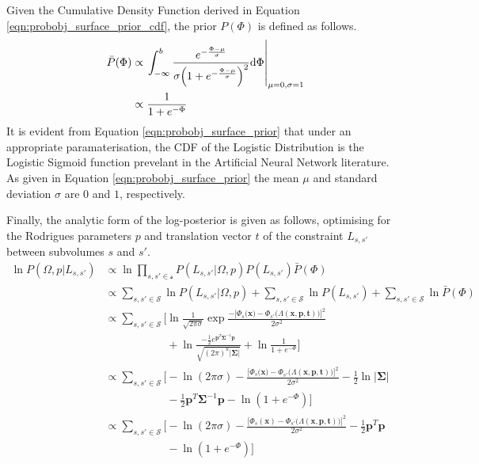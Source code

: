Given the Cumulative Density Function derived in Equation
\ref{eqn:probobj_surface_prior_cdf}, the prior $P(\Phi)$ is defined as follows.
\begin{align}
  \label{eqn:probobj_surface_prior}
  \bar{P}(\Phi) &\propto \left. \int_{-\infty}^{b} \frac
  {e^{-\frac{\Phi - \mu}{\sigma}}}
  {\sigma \Big( 1 + e^{-\frac{\Phi - \mu}{\sigma}} \Big)^{2}} {\mathrm d{\Phi}}
  \right\rvert_{\mu = 0, \sigma = 1}\\
  &\propto \frac{1}{1 + e^{-\Phi}}
\end{align}
It is evident from Equation \ref{eqn:probobj_surface_prior} that under an 
appropriate paramaterisation, the CDF of the Logistic Distribution is the 
Logistic Sigmoid function prevelant in the Artificial Neural Network literature. 
As given in Equation \ref{eqn:probobj_surface_prior} the mean $\mu$ and standard 
deviation $\sigma$ are $0$ and $1$, respectively.

Finally, the analytic form of the log-posterior is given as follows, optimising
for the Rodrigues parameters $p$ and translation vector $t$ of the constraint
$L_{s, s'}$ between subvolumes $s$ and $s'$.
\begin{align}
  \label{eqn:probobj_log_posterior}
  \ln P(\Omega, p | L_{s, s'}) &\propto \ln
  \prod_{s, s' \in \mathcal{s}} P(L_{s, s'} | \Omega, p)P(L_{s, s'})\bar{P}(\Phi)\\
  &\propto \sum_{s, s' \in \mathcal{S}} \ln P(L_{s, s'} | \Omega, p) +
  \sum_{s, s' \in \mathcal{S}} \ln P(L_{s, s'}) +
  \sum_{s, s' \in \mathcal{S}} \ln \bar{P}(\Phi)\\
  &\propto \sum_{s, s' \in \mathcal{S}} \Bigg[\ln \frac{1}{\sqrt{2 \pi \sigma}}
  \exp{\frac{-\Big[\Phi_{s}\big(\mathbf{x}\big) - \Phi_{s'}
  \big(\Lambda(\mathbf{x}, \mathbf{p}, \mathbf{t})\big)\Big]^{2}}
  {2\sigma^{2}}} \\
  &\phantom{\propto \sum_{s, s' \in \mathcal{S}} \Bigg[} %
  + \ln \frac{-\frac{1}{2} e^{\mathbf{p}^{T}\mathbf{\Sigma}^{-1}\mathbf{p}}}
  {\sqrt{(2\pi)^{k}\left|\mathbf{\Sigma}\right|}} +
  \ln \frac{1}{1 + e^{-\Phi}}\Bigg]\\
  &\propto \sum_{s, s' \in \mathcal{S}} \Bigg[ -\ln(2\pi\sigma) -
  \frac{\Big[\Phi_{s}\big(\mathbf{x}\big) -
  \Phi_{s'}\big(\Lambda(\mathbf{x}, \mathbf{p}, \mathbf{t})\big)\Big]^{2}}{2\sigma^{2}} -
  \frac{1}{2} \ln \left|\mathbf{\Sigma}\right|\\ 
  &\phantom{\propto \sum_{s, s' \in \mathcal{S}} \Bigg[} %
  - \frac{1}{2} \mathbf{p}^{T}\mathbf{\Sigma}^{-1}\mathbf{p} -
  \ln(1 + e^{-\Phi}) \Bigg]\\
  &\propto \sum_{s, s' \in \mathcal{S}} \Bigg[ -\ln(2\pi\sigma) -
  \frac{\Big[\Phi_{s}(\mathbf{x}) -
  \Phi_{s'}\big(\Lambda(\mathbf{x}, \mathbf{p}, \mathbf{t})\big)\Big]^{2}}{2\sigma^{2}} -
  \frac{1}{2} \mathbf{p}^{T}\mathbf{p} \\
  &\phantom{\propto \sum_{s, s' \in \mathcal{S}} \Bigg[} %
  - \ln(1 + e^{-\Phi}) \Bigg]
\end{align}

